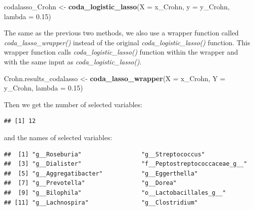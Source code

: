 \documentclass[openany]{book}
\newenvironment{Shaded}{\begin{snugshade}}{\end{snugshade}}
\newcommand{\KeywordTok}[1]{\textcolor[rgb]{0.13,0.29,0.53}{\textbf{#1}}}
\newcommand{\DataTypeTok}[1]{\textcolor[rgb]{0.13,0.29,0.53}{#1}}
\newcommand{\FloatTok}[1]{\textcolor[rgb]{0.00,0.00,0.81}{#1}}
\newcommand{\StringTok}[1]{\textcolor[rgb]{0.31,0.60,0.02}{#1}}
\newcommand{\OperatorTok}[1]{\textcolor[rgb]{0.81,0.36,0.00}{\textbf{#1}}}
\newcommand{\NormalTok}[1]{#1}
\begin{document}
\begin{Shaded}
\begin{Highlighting}[]
\NormalTok{codalasso_Crohn <-}\StringTok{ }\KeywordTok{coda_logistic_lasso}\NormalTok{(}\DataTypeTok{X =}\NormalTok{ x_Crohn, }\DataTypeTok{y =}\NormalTok{ y_Crohn, }\DataTypeTok{lambda =} \FloatTok{0.15}\NormalTok{)}
\end{Highlighting}
\end{Shaded}

The same as the previous two methods, we also use a wrapper function
called \emph{coda\_lasso\_wrapper()} instead of the original
\emph{coda\_logistic\_lasso()} function. This wrapper function calls
\emph{coda\_logistic\_lasso()} function within the wrapper and with the
same input as \emph{coda\_logistic\_lasso()}.

\begin{Shaded}
\begin{Highlighting}[]
\NormalTok{Crohn.results_codalasso <-}\StringTok{ }\KeywordTok{coda_lasso_wrapper}\NormalTok{(}\DataTypeTok{X =}\NormalTok{ x_Crohn, }\DataTypeTok{Y =}\NormalTok{ y_Crohn, }
                                              \DataTypeTok{lambda =} \FloatTok{0.15}\NormalTok{)}
\end{Highlighting}
\end{Shaded}

Then we get the number of selected variables:

\begin{Shaded}
\end{Shaded}

\begin{verbatim}
## [1] 12
\end{verbatim}

and the names of selected variables:

\begin{Shaded}
\end{Shaded}

\begin{verbatim}
##  [1] "g__Roseburia"                 "g__Streptococcus"            
##  [3] "g__Dialister"                 "f__Peptostreptococcaceae_g__"
##  [5] "g__Aggregatibacter"           "g__Eggerthella"              
##  [7] "g__Prevotella"                "g__Dorea"                    
##  [9] "g__Bilophila"                 "o__Lactobacillales_g__"      
## [11] "g__Lachnospira"               "g__Clostridium"
\end{verbatim}
\end{document}
